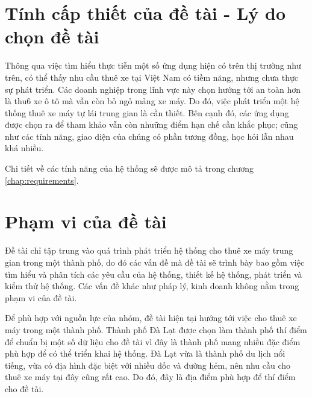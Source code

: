 \documentclass[../main.tex]{subfiles}
\begin{document}



	\section{Tính cấp thiết của đề tài - Lý do chọn đề tài}

	Thông qua việc tìm hiểu thực tiễn một số ứng dụng hiện có trên thị trường như trên, có thể thấy nhu cầu thuê xe tại
	Việt Nam có tiềm năng, nhưng chưa thực sự phát triển. Các doanh nghiệp trong lĩnh vực này chọn hướng tới an toàn
	hơn là thu6 xe ô tô mà vẫn còn bỏ ngỏ mảng xe máy. Do đó, việc phát triển một hệ thống thuê xe máy tự lái trung
	gian là cần thiết. Bên cạnh đó, các ứng dụng được chọn ra để tham khảo vẫn còn nhuững điểm hạn chế cần khắc phục;
	cũng như các tính năng, giao diện của chúng có phần tương đồng, học hỏi lẫn nhau khá nhiều.

	Chi tiết về các tính năng của hệ thống sẽ được mô tả trong chương \ref{chap:requirements}.


	\section{Phạm vi của đề tài}

	Đề tài chỉ tập trung vào quá trình phát triển hệ thống cho thuê xe máy trung gian trong một thành phố, do đó các
	vấn đề mà đề tài sẽ trình bày bao gồm việc tìm hiểu và phân tích các yêu cầu của hệ thống, thiết kế hệ thống, phát
	triển và kiểm thử hệ thống. Các vấn đề khác như pháp lý, kinh doanh không nằm trong phạm vi của đề tài.

	Để phù hợp với nguồn lực của nhóm, đề tài hiện tại hướng tới việc cho thuê xe máy trong một thành phố. Thành phố Đà
	Lạt được chọn làm thành phố thí điểm để chuẩn bị một số dữ liệu cho đề tài vì đây là thành phố mang nhiều đặc điểm
	phù hợp để có thể triển khai hệ thống. Đà Lạt vừa là thành phố du lịch nổi tiếng, vừa có địa hình đặc biệt với
	nhiều dốc và đường hẻm, nên nhu cầu cho thuê xe máy tại đây cũng rất cao. Do đó, đây là địa điểm phù hợp để thí
	điểm cho đề tài.
\end{document}
